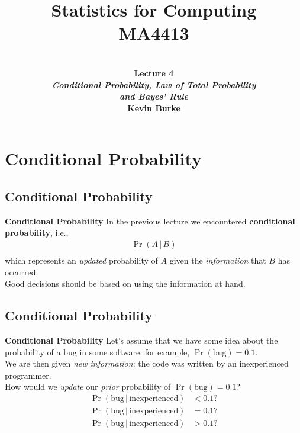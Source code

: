 \documentclass[compress]{beamer}        %
\title{{\huge Statistics for Computing\\[0.1cm]MA4413}}
\author[Kevin Burke]{{\bf\\[0.5cm]{\huge Lecture 4}\\[0.2cm]\emph{Conditional Probability, Law of Total Probability\\and Bayes' Rule}\\[1.4cm]Kevin Burke}\\[0.3cm]\tcb{kevin.burke@ul.ie}}
\institute[University of Limerick, Maths \& Stats Dept]{}
\date{}
\makeatletter
\newcommand{\tcb}{\textcolor{beamer@blendedblue}}
\makeatother
\begin{document}
\begin{frame}[t]
\titlepage
\end{frame}


\section{Conditional Probability}
\subsection{Conditional Probability}
\begin{frame}{\bf \tcb{Conditional Probability}}
In the previous lecture we encountered {\bf conditional probability}, i.e.,\\[0.1cm]
\begin{align*}
\Pr(A\,|\,B)\\[-0.3cm]
\end{align*}
which represents an \emph{updated} probability of $A$ given the \emph{information} that $B$ has occurred.\\[0.8cm]
Good decisions should be based on using the information at hand.\\[0.8cm]
\end{frame}


\subsection{Conditional Probability}
\begin{frame}{\bf \tcb{Conditional Probability}}
Let's assume that we have some idea about the probability of a bug in some software, for example, $\Pr(\text{bug}) = 0.1$.\\[0.6cm]
We are then given \emph{new information}: the code was written by an inexperienced programmer.\\[0.6cm]
How would we \emph{update} our \emph{prior} probability of $\Pr(\text{bug}) = 0.1$?
\begin{align*}
\Pr(\text{bug}\,|\,\text{inexperienced}) &< 0.1?\\[0.2cm]
\Pr(\text{bug}\,|\,\text{inexperienced}) &= 0.1?\\[0.2cm]
\Pr(\text{bug}\,|\,\text{inexperienced}) &> 0.1?
\end{align*}
\end{frame}
\end{document}
